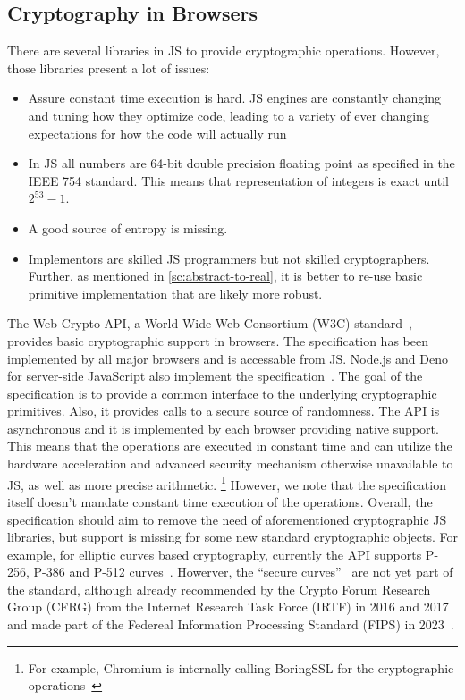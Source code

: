 \subsection{Cryptography in Browsers}\label{sc:webcrypto-api}

There are several libraries in JS to provide cryptographic
operations.
However, those libraries present a lot of issues:
\begin{itemize}
    \item Assure constant time execution is hard. JS engines are constantly changing and tuning how they optimize code, leading to a variety of ever changing expectations for how the code will actually run
    \item In JS all numbers are 64-bit double precision floating point as specified in the IEEE 754 standard. This means that representation of integers is exact until $2^{53} - 1$.
    \item A good source of entropy is missing.
    \item Implementors are skilled JS programmers but not skilled cryptographers. Further, as mentioned in \cref{sc:abstract-to-real}, it is better to re-use basic primitive implementation that are likely more robust. 
\end{itemize}

The Web Crypto API, a World Wide Web Consortium (W3C) standard~\cite{WebCryptoAPISpecification}, 
provides basic cryptographic support in browsers.
The specification has been implemented by all major browsers
and is accessable from JS. 
Node.js and Deno for server-side JavaScript also implement the specification~\cite{NodeJsWebCryptoAPI, DenoWebCryptoAPI}.
The goal of the specification
is to provide a common interface to the underlying 
cryptographic primitives. Also, it provides calls to
a secure source of randomness. 
The API is asynchronous and it is implemented by each
browser providing native support. This means that the
operations are executed in constant time and can
utilize the hardware acceleration and advanced
security mechanism otherwise unavailable to JS, as well as
more precise arithmetic.
\footnote{For example, Chromium is internally calling BoringSSL for the cryptographic operations~\cite{ChromiumWebCryptoAPIImplementation}}
However, we note that the specification itself doesn't mandate
constant time execution of the operations.
Overall, the specification should aim to 
remove the need of aforementioned cryptographic JS libraries,
but support is missing for some new standard cryptographic objects. 
For example, for elliptic curves based cryptography, currently
the API supports P-256, P-386 and P-512 curves~\cite{WebCryptoAPICurvesSupport}.
Howerver, the ``secure curves''~\cite{WebCryptoAPISecureCurvesDraft,WebCryptoAPISecureCurvesExplainer}
are not yet part of the standard, although already recommended by
the Crypto Forum Research Group (CFRG) from the Internet Research
Task Force (IRTF) in 2016 and 2017~\cite{RFC7748IRTF, RFC8032IRTF}
and made part of the Federeal Information Processing Standard (FIPS) in 2023~\cite{SecureCurvesNIST}.

